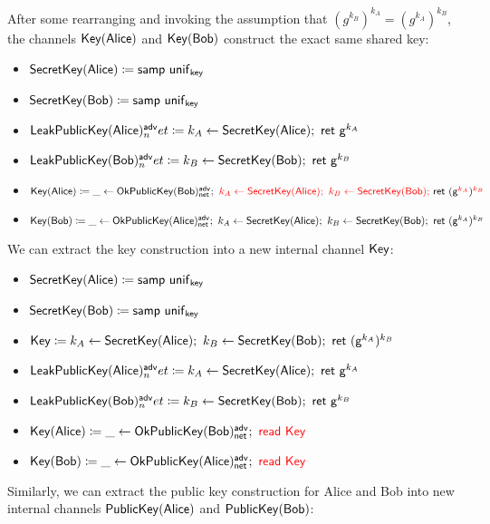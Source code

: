 \noindent After some rearranging and invoking the assumption that $(g^{k_B})^{k_A} = (g^{k_A})^{k_B}$, the channels $\mathsf{Key}(\mathsf{Alice})$ and $\mathsf{Key}(\mathsf{Bob})$ construct the exact same shared key:

\begin{itemize}
\item $\mathsf{SecretKey}(\mathsf{Alice}) \coloneqq \mathsf{samp} \ \mathsf{unif}_{\mathsf{key}}$
\item $\mathsf{SecretKey}(\mathsf{Bob}) \coloneqq \mathsf{samp} \ \mathsf{unif}_{\mathsf{key}}$
\item $\LeakPublicKey(\Alice)^\adv_net \coloneqq k_A \leftarrow \SecretKey(\Alice); \ \ret{\gen^{k_A}}$
\item $\LeakPublicKey(\Bob)^\adv_net \coloneqq k_B \leftarrow \SecretKey(\Bob); \ \ret{\gen^{k_B}}$
\item $\mathsf{Key}(\mathsf{Alice}) \coloneqq \_ \leftarrow \mathsf{OkPublicKey}(\mathsf{Bob})^{\mathsf{adv}}_{\mathsf{net}}; \ {\color{red} k_A \leftarrow \mathsf{SecretKey}(\mathsf{Alice}); \ k_B \leftarrow \mathsf{SecretKey}(\mathsf{Bob}); \ } \mathsf{ret} \ (\mathsf{g}^{\color{red} k_A})^{\color{red} k_B}$
\item $\Key(\Bob) \coloneqq \_ \leftarrow \OkPublicKey(\Alice)^\adv_\net; \ k_A \leftarrow \SecretKey(\Alice); \ k_B \leftarrow \SecretKey(\Bob); \ \ret{(\gen^{k_A})^{k_B}}$
\end{itemize}

\noindent We can extract the key construction into a new internal channel $\mathsf{Key}$:

\begin{itemize}
\item $\mathsf{SecretKey}(\mathsf{Alice}) \coloneqq \mathsf{samp} \ \mathsf{unif}_{\mathsf{key}}$
\item $\mathsf{SecretKey}(\mathsf{Bob}) \coloneqq \mathsf{samp} \ \mathsf{unif}_{\mathsf{key}}$
\item {\color{red} $\Key \coloneqq k_A \leftarrow \SecretKey(\Alice); \ k_B \leftarrow \SecretKey(\Bob); \ \ret{(\gen^{k_A})^{k_B}}$}
\item $\LeakPublicKey(\Alice)^\adv_net \coloneqq k_A \leftarrow \SecretKey(\Alice); \ \ret{\gen^{k_A}}$
\item $\LeakPublicKey(\Bob)^\adv_net \coloneqq k_B \leftarrow \SecretKey(\Bob); \ \ret{\gen^{k_B}}$
\item $\mathsf{Key}(\mathsf{Alice}) \coloneqq \_ \leftarrow \mathsf{OkPublicKey}(\mathsf{Bob})^{\mathsf{adv}}_{\mathsf{net}}; \ {\color{red} \mathsf{read} \ \mathsf{Key}}$
\item $\mathsf{Key}(\mathsf{Bob}) \coloneqq \_ \leftarrow \mathsf{OkPublicKey}(\mathsf{Alice})^{\mathsf{adv}}_{\mathsf{net}}; \ {\color{red} \mathsf{read} \ \mathsf{Key}}$
\end{itemize}

\noindent Similarly, we can extract the public key construction for Alice and Bob into new internal channels $\mathsf{PublicKey}(\mathsf{Alice})$ and $\mathsf{PublicKey}(\mathsf{Bob})$:

